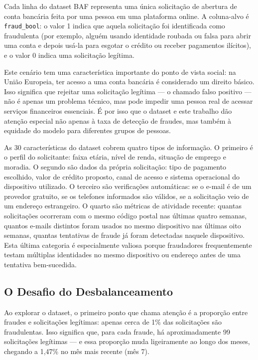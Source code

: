 Cada linha do dataset BAF representa uma única solicitação de abertura de conta bancária feita por uma pessoa em uma plataforma online. A coluna-alvo é \texttt{fraud\_bool}: o valor 1 indica que aquela solicitação foi identificada como fraudulenta (por exemplo, alguém usando identidade roubada ou falsa para abrir uma conta e depois usá-la para esgotar o crédito ou receber pagamentos ilícitos), e o valor 0 indica uma solicitação legítima.

Este cenário tem uma característica importante do ponto de vista social: na União Europeia, ter acesso a uma conta bancária é considerado um direito básico. Isso significa que rejeitar uma solicitação legítima --- o chamado falso positivo --- não é apenas um problema técnico, mas pode impedir uma pessoa real de acessar serviços financeiros essenciais. É por isso que o dataset e este trabalho dão atenção especial não apenas à taxa de detecção de fraudes, mas também à equidade do modelo para diferentes grupos de pessoas.

As 30 características do dataset cobrem quatro tipos de informação. O primeiro é o perfil do solicitante: faixa etária, nível de renda, situação de emprego e moradia. O segundo são dados da própria solicitação: tipo de pagamento escolhido, valor de crédito proposto, canal de acesso e sistema operacional do dispositivo utilizado. O terceiro são verificações automáticas: se o e-mail é de um provedor gratuito, se os telefones informados são válidos, se a solicitação veio de um endereço estrangeiro. O quarto são métricas de atividade recente: quantas solicitações ocorreram com o mesmo código postal nas últimas quatro semanas, quantos e-mails distintos foram usados no mesmo dispositivo nas últimas oito semanas, quantas tentativas de fraude já foram detectadas naquele dispositivo. Esta última categoria é especialmente valiosa porque fraudadores frequentemente testam múltiplas identidades no mesmo dispositivo ou endereço antes de uma tentativa bem-sucedida.

\subsection{O Desafio do Desbalanceamento}

Ao explorar o dataset, o primeiro ponto que chama atenção é a proporção entre fraudes e solicitações legítimas: apenas cerca de 1\% das solicitações são fraudulentas. Isso significa que, para cada fraude, há aproximadamente 99 solicitações legítimas --- e essa proporção muda ligeiramente ao longo dos meses, chegando a 1,47\% no mês mais recente (mês 7).

